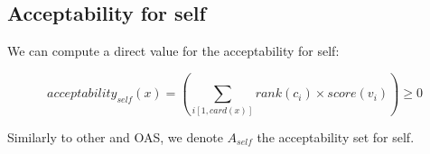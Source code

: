 \documentclass{article}
\begin{document}
	\subsection{Acceptability for self}
	
	We can compute a direct value for the acceptability for self:
	
	$$acceptability_{self}(x) = \left(\sum_{i[1,card(x)]} rank(c_i)\times score(v_i)\right)\geq0$$
	
	Similarly to other and OAS, we denote $A_{self}$ the acceptability set for self.
	
%	
%	
%		
%		
\end{document}
